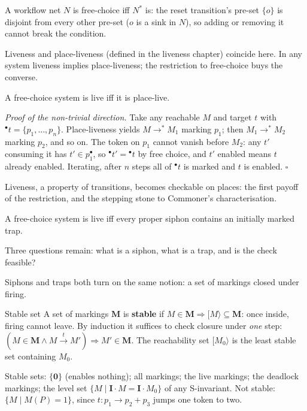 \begin{proposition}
A workflow net $N$ is free-choice iff $N^*$ is: the reset transition's pre-set $\{o\}$ is disjoint from every other pre-set ($o$ is a sink in $N$), so adding or removing it cannot break the condition.
\end{proposition}

Liveness and place-liveness (defined in the liveness chapter) coincide here. In any system liveness implies place-liveness; the restriction to free-choice buys the converse.

\begin{theorem}[Liveness $=$ place-liveness]
A free-choice system is live iff it is place-live.
\end{theorem}
\textit{Proof of the non-trivial direction.} Take any reachable $M$ and target $t$ with ${}^\bullet t = \{p_1, \ldots, p_n\}$. Place-liveness yields $M \to^\ast M_1$ marking $p_1$; then $M_1 \to^\ast M_2$ marking $p_2$, and so on. The token on $p_1$ cannot vanish before $M_2$: any $t'$ consuming it has $t' \in p_1^\bullet$, so ${}^\bullet t' = {}^\bullet t$ by free choice, and $t'$ enabled means $t$ already enabled. Iterating, after $n$ steps all of ${}^\bullet t$ is marked and $t$ is enabled. \hfill$\square$

Liveness, a property of transitions, becomes checkable on places: the first payoff of the restriction, and the stepping stone to Commoner's characterisation.

\begin{theorem}[Commoner]
A free-choice system is live iff every proper siphon contains an initially marked trap.
\end{theorem}

Three questions remain: what is a siphon, what is a trap, and is the check feasible?

Siphons and traps both turn on the same notion: a set of markings closed under firing.

\begin{definitionbox}{Stable set}
A set of markings $\mathbf{M}$ is \textbf{stable} if $M \in \mathbf{M} \Rightarrow [M\rangle \subseteq \mathbf{M}$: once inside, firing cannot leave. By induction it suffices to check closure under \emph{one} step: $(M \in \mathbf{M} \wedge M \xrightarrow{t} M') \Rightarrow M' \in \mathbf{M}$. The reachability set $[M_0\rangle$ is the least stable set containing $M_0$.
\end{definitionbox}

Stable sets: $\{\mathbf{0}\}$ (enables nothing); all markings; the live markings; the deadlock markings; the level set $\{M \mid \mathbf{I} \cdot M = \mathbf{I} \cdot M_0\}$ of any S-invariant. Not stable: $\{M \mid M(P) = 1\}$, since $t : p_1 \to p_2 + p_3$ jumps one token to two.

